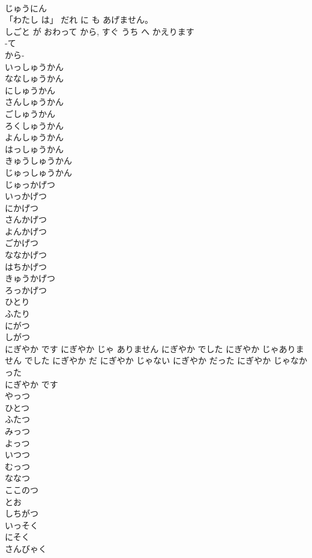 \documentclass[8pt]{extreport}
\begin{document}
\begin{CJK}{UTF8}{min}
\\	じゅうにん	
\\	「わたし は」 だれ に も あげません。	
\\	しごと が おわって から, すぐ うち へ かえります	
\\	-て 
\\	から- 
\\	いっしゅうかん	
\\	ななしゅうかん	
\\	にしゅうかん	
\\	さんしゅうかん	
\\	ごしゅうかん	
\\	ろくしゅうかん	
\\	よんしゅうかん	
\\	はっしゅうかん	
\\	きゅうしゅうかん	
\\	じゅっしゅうかん	
\\	じゅっかげつ	
\\	いっかげつ	
\\	にかげつ	
\\	さんかげつ	
\\	よんかげつ	
\\	ごかげつ	
\\	ななかげつ	
\\	はちかげつ	
\\	きゅうかげつ	
\\	ろっかげつ	
\\	ひとり	
\\	ふたり	
\\	にがつ	
\\	しがつ	
\\	にぎやか です にぎやか じゃ ありません にぎやか でした にぎやか じゃありません でした	にぎやか だ にぎやか じゃない にぎやか だった にぎやか じゃなかった	
\\	にぎやか です	
\\	やっつ	
\\	ひとつ	
\\	ふたつ	
\\	みっつ	
\\	よっつ	
\\	いつつ	
\\	むっつ	
\\	ななつ	
\\	ここのつ	
\\	とお	
\\	しちがつ	
\\	いっそく	
\\	にそく	
\\	さんびゃく

\end{CJK}
\end{document}
